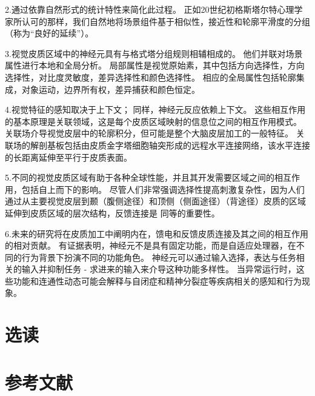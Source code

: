 2.通过依靠自然形式的统计特性来简化此过程。
正如20世纪初格斯塔尔特心理学家所认可的那样，我们自然地将场景组件基于相似性，接近性和轮廓平滑度的分组（称为“良好的延续”）。 


3.视觉皮质区域中的神经元具有与格式塔分组规则相辅相成的。
他们并联对场景属性进行本地和全局分析。
局部属性是视觉原始素，其中包括方向选择性，方向选择性，对比度灵敏度，差异选择性和颜色选择性。
相应的全局属性包括轮廓集成，对象运动，边界所有权，差异捕获和颜色恒定。 


4.视觉特征的感知取决于上下文； 
同样，神经元反应依赖上下文。 
这些相互作用的基本原理是关联领域，这是每个皮质区域映射的信息位之间的相互作用模式。
关联场介导视觉皮层中的轮廓积分，但可能是整个大脑皮层加工的一般特征。
关联场的解剖基板包括由皮质金字塔细胞轴突形成的远程水平连接网络，该水平连接的长距离延伸至平行于皮质表面。 


5.不同的视觉皮质区域有助于各种全球性能，并且其开发需要区域之间的相互作用，包括自上而下的影响。
尽管人们非常强调选择性提高刺激复杂性，因为人们通过从主要视觉皮层到颞（腹侧途径）和顶侧（侧面途径）（背途径）皮质的区域延伸到皮质区域的层次结构，反馈连接是 同等的重要性。 


6.未来的研究将在皮质加工中阐明内在，馈电和反馈皮质连接及其之间的相互作用的相对贡献。 
有证据表明，神经元不是具有固定功能，而是自适应处理器，在不同的行为背景下扮演不同的功能角色。
神经元可以通过输入选择，表达与任务相关的输入并抑制任务 - 求进来的输入来介导这种功能多样性。
当异常运行时，这些功能和连通性动态可能会解释与自闭症和精神分裂症等疾病相关的感知和行为现象。


\section{选读}
\section{参考文献}